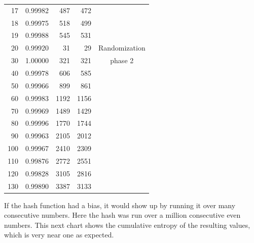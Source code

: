 \documentclass[preprint,natbib]{sigplanconf}
\begin{document}
\begin{minipage}{\columnwidth}
\begin{tabular}{|r|r|r|r|c|}
        17                 & 0.99982          & 487           & 472            &                \\
        18                 & 0.99975          & 518           & 499            &                \\
        19                 & 0.99988          & 545           & 531            &                \\
        \hline
        20                 & 0.99920          & 31            & 29             & Randomization       \\
        30                 & 1.00000          & 321           & 321            & phase 2      \\
        40                 & 0.99978          & 606           & 585            &        \\
        50                 & 0.99966          & 899           & 861            &                \\
        60                 & 0.99983          & 1192          & 1156           &                \\
        70                 & 0.99969          & 1489          & 1429           &                \\
        80                 & 0.99996          & 1770          & 1744           &                \\
        90                 & 0.99963          & 2105          & 2012           &                \\
        100                & 0.99967          & 2410          & 2309           &                \\
        110                & 0.99876          & 2772          & 2551           &                \\
        120                & 0.99828          & 3105          & 2816           &                \\
        130                & 0.99890          & 3387          & 3133           &                \\
        \hline
    \end{tabular}
\end{minipage}

If the hash function had a bias, it would show up by running it over many consecutive numbers. Here the hash was run over a million consecutive even numbers. This next chart shows the cumulative entropy of the resulting values, which is very near one as expected.
\end{document}
